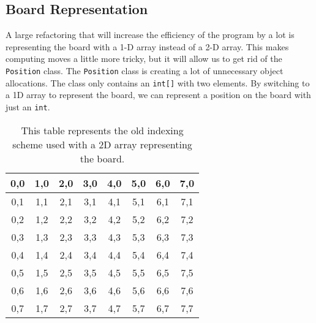 \documentclass[sigconf]{acmart}
\begin{document}
\subsection{Board Representation}
A large refactoring that will increase the efficiency of the program by a lot is representing the board with a 1-D array instead of a 2-D array.
This makes computing moves a little more tricky, but it will allow us to get rid of the \texttt{Position} class.
The \texttt{Position} class is creating a lot of unnecessary object allocations.
The class only contains an \texttt{int[]} with two elements. By switching to a 1D array to represent the board, we can represent a position on the board with just an \texttt{int}.
\begin{table}[H]
    \renewcommand{\arraystretch}{1.5}
    \setlength{\arrayrulewidth}{1pt}
    \setlength{\tabcolsep}{4pt}
    \begin{tabular}{|c|c|c|c|c|c|c|c|}
        \hline
        0,0  & 1,0  & 2,0  & 3,0  & 4,0  & 5,0  & 6,0  & 7,0  \\
        \hline
        0,1  & 1,1  & 2,1  & 3,1  & 4,1  & 5,1  & 6,1  & 7,1  \\
        \hline
        0,2  & 1,2  & 2,2  & 3,2  & 4,2  & 5,2  & 6,2  & 7,2  \\
        \hline
        0,3  & 1,3  & 2,3  & 3,3  & 4,3  & 5,3  & 6,3  & 7,3  \\
        \hline
        0,4  & 1,4  & 2,4  & 3,4  & 4,4  & 5,4  & 6,4  & 7,4  \\
        \hline
        0,5  & 1,5  & 2,5  & 3,5  & 4,5  & 5,5  & 6,5  & 7,5  \\
        \hline
        0,6  & 1,6  & 2,6  & 3,6  & 4,6  & 5,6  & 6,6  & 7,6  \\
        \hline
        0,7  & 1,7  & 2,7  & 3,7  & 4,7  & 5,7  & 6,7  & 7,7  \\
        \hline
    \end{tabular}
    \caption{This table represents the old indexing scheme used with a 2D array representing the board.}
    \label{tab:example_table}
\end{table} 
\end{document}
